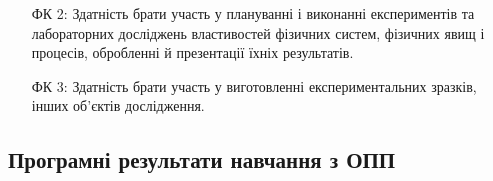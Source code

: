 \documentclass{Syllabus}
\begin{document}
\begin{enumerate}
\item [ФК 2:] Здатність брати участь у плануванні і виконанні експериментів та лабораторних досліджень властивостей фізичних систем, фізичних явищ і процесів, обробленні й презентації їхніх результатів.
\item [ФК 3:] Здатність брати участь у виготовленні експериментальних зразків, інших об'єктів дослідження.
\end{enumerate}

\subsection*{Програмні результати навчання з ОПП}
\end{document}
